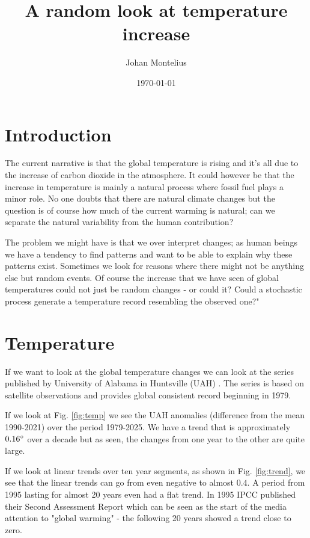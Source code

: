 \documentclass[a4paper,11pt]{article}
\begin{document}
\title{
  \textbf{A random look at temperature increase} \\
}
\author{Johan Montelius}
\date{\today}

\maketitle

\section*{Introduction}

The current narrative is that the global temperature is rising and
it's all due to the increase of carbon dioxide in the atmosphere. It
could however be that the increase in temperature is mainly a natural
process where fossil fuel plays a minor role. No one doubts that there
are natural climate changes but the question is of course how much of
the current warming is natural; can we separate the natural
variability from the human contribution?

The problem we might have is that we over interpret changes; as human
beings we have a tendency to find patterns and want to be able to
explain why these patterns exist. Sometimes we look for reasons where
there might not be anything else but random events. Of course the
increase that we have seen of global temperatures could not just be
random changes - or could it? Could a stochastic process generate a
temperature record resembling the observed one?"

\section*{Temperature}

If we want to look at the global temperature changes we can look at
the series published by University of Alabama in Huntsville (UAH)
\cite{uah:60}. The series is based on satellite observations and
provides global consistent record beginning in 1979. 
 
If we look at Fig. \ref{fig:temp} we see the UAH anomalies (difference
from the mean 1990-2021) over the period 1979-2025. We have a trend
that is approximately $0.16\degree$ over a decade but as seen, the
changes from one year to the other are quite large.

If we look at linear trends over ten year segments, as shown in
Fig. \ref{fig:trend}, we see that the linear trends can go from even
negative to almost $0.4$. A period from 1995 lasting for almost 20
years even had a flat trend. In 1995 IPCC published their Second
Assessment Report \cite{ipcc:ar2} which can be seen as the start of
the media attention to "global warming" - the following 20 years
showed a trend close to zero.
\end{document}
